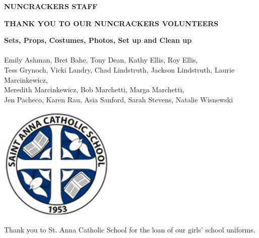 \documentclass[12pt, a5paper, oneside]{article}
\begin{document}
\pagebreak
\begin{center}
\Large \textbf{NUNCRACKERS STAFF}
\end{center}
\raggedright
\begin{center}
    \Large\textbf{THANK YOU TO OUR NUNCRACKERS VOLUNTEERS}\\
\end{center}
\begin{center}
\textbf{Sets, Props, Costumes, Photos, Set up and Clean up}\\
\hfill\\
Emily Ashman, Bret Bahe, Tony Dean, Kathy Ellis, Roy Ellis, \\Tess Grynoch, Vicki Landry, Chad Lindstruth, Jackson Lindstruth, Laurie Marcinkewicz, \\Meredith Marcinkewicz, Bob Marchetti, Marga Marchetti, \\Jen Pacheco, Karen Rau, Asia Sanford, Sarah Stevens, Natalie Wisnewski
\end{center}
\begin{framed}
\begin{minipage}[c][0.25\textheight]{0.5\linewidth}
	\raggedright\includegraphics[scale=0.4]{media/st_anna_logo.png}
\end{minipage}
\raggedright
\begin{minipage}[0.25\textheight]{0.4\linewidth}
\raggedright Thank you to St. Anna Catholic School for the loan of our girls' school uniforms.	
\end{minipage}
\end{framed}
\end{document}
